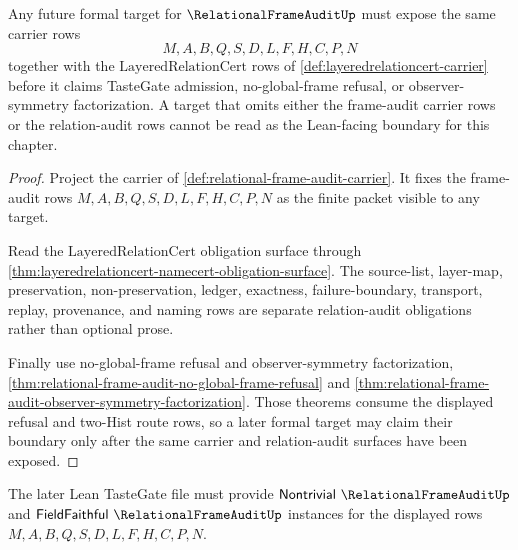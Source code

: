 \begin{theorem}
\label{thm:relational-frame-audit-formal-target-boundary}
Any future formal target for $\RelationalFrameAuditUp$ must expose the same carrier rows
$$
M,A,B,Q,S,D,L,F,H,C,P,N
$$
together with the $\mathrm{LayeredRelationCert}$ rows of \autoref{def:layeredrelationcert-carrier} before it claims TasteGate admission, no-global-frame refusal, or observer-symmetry factorization. A target that omits either the frame-audit carrier rows or the relation-audit rows cannot be read as the Lean-facing boundary for this chapter.
\end{theorem}
\begin{proof}
Project the carrier of \autoref{def:relational-frame-audit-carrier}. It fixes the frame-audit rows $M,A,B,Q,S,D,L,F,H,C,P,N$ as the finite packet visible to any target.

Read the $\mathrm{LayeredRelationCert}$ obligation surface through \autoref{thm:layeredrelationcert-namecert-obligation-surface}. The source-list, layer-map, preservation, non-preservation, ledger, exactness, failure-boundary, transport, replay, provenance, and naming rows are separate relation-audit obligations rather than optional prose.

Finally use no-global-frame refusal and observer-symmetry factorization, \autoref{thm:relational-frame-audit-no-global-frame-refusal} and \autoref{thm:relational-frame-audit-observer-symmetry-factorization}. Those theorems consume the displayed refusal and two-Hist route rows, so a later formal target may claim their boundary only after the same carrier and relation-audit surfaces have been exposed.
\end{proof}



The later Lean TasteGate file must provide $\mathsf{Nontrivial}\ \RelationalFrameAuditUp$ and $\mathsf{FieldFaithful}\ \RelationalFrameAuditUp$ instances for the displayed rows $M,A,B,Q,S,D,L,F,H,C,P,N$.

